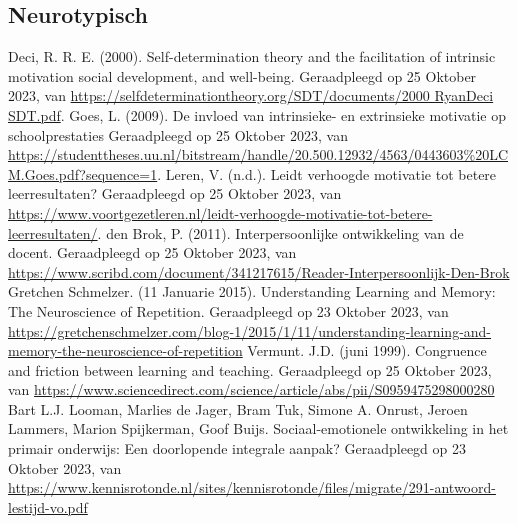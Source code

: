 \documentclass{article}
\begin{document}
    
    \pagestyle{empty}
    \renewcommand{\refname}{Literatuurlijst}
    \begin{thebibliography}{9}

        \item[\bigskip\subsection*{Neurotypisch}]
                Deci, R. R. E. (2000). Self-determination theory and the facilitation of intrinsic motivation social development, and well-being. Geraadpleegd op 25 Oktober 2023, van \url{https://selfdeterminationtheory.org/SDT/documents/2000 RyanDeci SDT.pdf}.
                Goes, L. (2009). De invloed van intrinsieke- en extrinsieke motivatie op schoolprestaties Geraadpleegd op 25 Oktober 2023, van \url{https://studenttheses.uu.nl/bitstream/handle/20.500.12932/4563/0443603%20LCM.Goes.pdf?sequence=1}.
                Leren, V. (n.d.). Leidt verhoogde motivatie tot betere leerresultaten? Geraadpleegd op 25 Oktober 2023, van \url{https://www.voortgezetleren.nl/leidt-verhoogde-motivatie-tot-betere-leerresultaten/}.
                den Brok, P. (2011). Interpersoonlijke ontwikkeling van de docent. Geraadpleegd op 25 Oktober 2023, van \url{https://www.scribd.com/document/341217615/Reader-Interpersoonlijk-Den-Brok}
                Gretchen Schmelzer. (11 Januarie 2015). Understanding Learning and Memory: The Neuroscience of Repetition. Geraadpleegd op 23 Oktober 2023, van \url{https://gretchenschmelzer.com/blog-1/2015/1/11/understanding-learning-and-memory-the-neuroscience-of-repetition}
                Vermunt. J.D. (juni 1999). Congruence and friction between learning and teaching. Geraadpleegd op 25 Oktober 2023, van \url{https://www.sciencedirect.com/science/article/abs/pii/S0959475298000280}
                Bart L.J. Looman, Marlies de Jager, Bram Tuk, Simone A. Onrust, Jeroen Lammers, Marion Spijkerman, Goof Buijs. Sociaal-emotionele ontwikkeling in het primair onderwijs: Een doorlopende integrale aanpak? Geraadpleegd op 23 Oktober 2023, van \url{https://www.kennisrotonde.nl/sites/kennisrotonde/files/migrate/291-antwoord-lestijd-vo.pdf}

\end{thebibliography}
\end{document}
